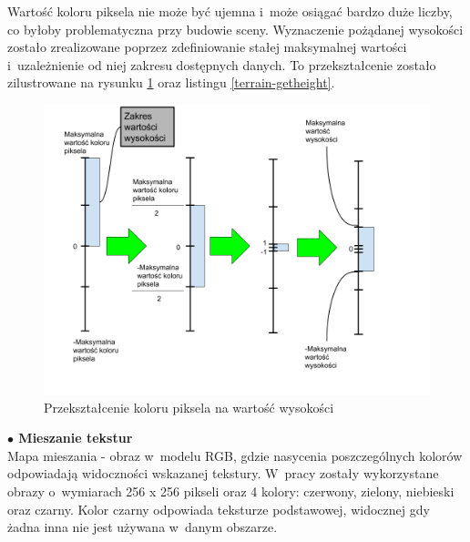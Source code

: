 \documentclass[a4paper,twoside,12pt]{book}
\begin{document}
Wartość koloru piksela nie może być ujemna i~może osiągać bardzo duże liczby, co byłoby problematyczna przy budowie sceny. Wyznaczenie pożądanej wysokości zostało zrealizowane poprzez zdefiniowanie stałej maksymalnej wartości i~uzależnienie od niej zakresu dostępnych danych. To przekształcenie zostało zilustrowane na rysunku \ref{fig:terrain_heighttransform} oraz listingu \ref{terrain-getheight}.



\begin{figure}[H]
    \centering
    \includegraphics[width=1.2\textwidth]{res/terrain_heighttransform.png}
    \caption{Przekształcenie koloru piksela na wartość wysokości}
    \label{fig:terrain_heighttransform}
\end{figure}


\vspace{\baselineskip}
\textbf{$\bullet$ Mieszanie tekstur} \\
Mapa mieszania - obraz w~modelu RGB, gdzie nasycenia poszczególnych kolorów odpowiadają widoczności wskazanej tekstury. W~pracy zostały wykorzystane obrazy o~wymiarach 256 x 256 pikseli oraz 4 kolory: czerwony, zielony, niebieski oraz czarny. Kolor czarny odpowiada teksturze podstawowej, widocznej gdy żadna inna nie jest używana w~danym obszarze.
\end{document}

